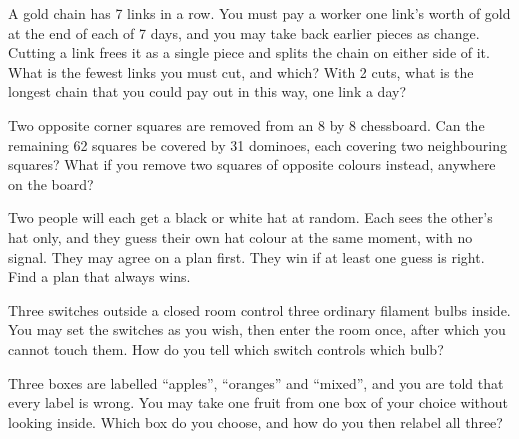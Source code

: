 \begin{question}\label{iq:iv1:logic-riddles:6}
A gold chain has 7 links in a row. You must pay a worker one link's worth of gold at the end of each of 7 days, and you may take back earlier pieces as change. Cutting a link frees it as a single piece and splits the chain on either side of it. What is the fewest links you must cut, and which? With 2 cuts, what is the longest chain that you could pay out in this way, one link a day?
\end{question}

\begin{question}\label{iq:iv1:logic-riddles:7}
Two opposite corner squares are removed from an 8 by 8 chessboard. Can the remaining 62 squares be covered by 31 dominoes, each covering two neighbouring squares? What if you remove two squares of opposite colours instead, anywhere on the board?
\end{question}

\begin{question}\label{iq:iv1:logic-riddles:8}
Two people will each get a black or white hat at random. Each sees the other's hat only, and they guess their own hat colour at the same moment, with no signal. They may agree on a plan first. They win if at least one guess is right. Find a plan that always wins.
\end{question}

\begin{question}\label{iq:iv1:logic-riddles:9}
Three switches outside a closed room control three ordinary filament bulbs inside. You may set the switches as you wish, then enter the room once, after which you cannot touch them. How do you tell which switch controls which bulb?
\end{question}

\begin{question}\label{iq:iv1:logic-riddles:10}
Three boxes are labelled ``apples'', ``oranges'' and ``mixed'', and you are told that every label is wrong. You may take one fruit from one box of your choice without looking inside. Which box do you choose, and how do you then relabel all three?
\end{question}


